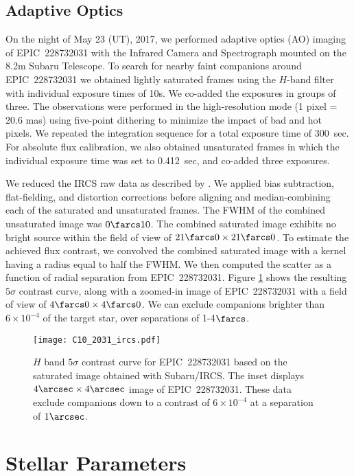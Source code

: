 \documentclass[twocolumn]{aastex61}
\begin{document}
\subsection{Adaptive Optics}

On the night of May 23 (UT), 2017, we performed adaptive optics (AO) imaging of EPIC~228732031
with the Infrared Camera and Spectrograph \citep[IRCS:][]{Kobayashi2000} mounted 
on the 8.2m Subaru Telescope. To search for nearby faint companions around EPIC~228732031
we obtained lightly saturated frames using the $H$-band filter with individual exposure times 
of 10s. We co-added the exposures in groups of three.
The observations were performed in the high-resolution mode (1 pixel = 20.6 mas)
using five-point dithering to minimize the impact of bad and hot pixels. We repeated 
the integration sequence for a total exposure time of 300~sec.
For absolute 
flux calibration, we also obtained unsaturated frames in which the individual exposure time was 
set to 0.412~sec, and co-added three exposures.

We reduced the IRCS raw data as described by \citet{Hirano2016}. We applied
bias subtraction, flat-fielding, and distortion corrections before aligning and 
median-combining each of the saturated and unsaturated frames.
The FWHM of the combined unsaturated image was $0\farcs 10$.
The combined saturated image exhibits no bright source within the field of view of $21\farcs0\times 21\farcs0$. 
To estimate the achieved flux contrast, we convolved the combined saturated 
image with a kernel having a radius equal to half the FWHM. We then computed the scatter 
as a function of radial separation from EPIC~228732031. Figure \ref{ircs} 
shows the resulting $5\sigma$ contrast curve, along with a zoomed-in image of
EPIC~228732031 with a field of view of $4\farcs0\times 4\farcs0$. We can exclude companions brighter than $6\times10^{-4}$ of the target star, over separations of 1-4$\farcs$. 

\begin{figure}
\centering\texttt{[image: C10\_2031\_ircs.pdf]}
\caption{$H$ band $5\sigma$ contrast curve for EPIC~228732031 based on the saturated image
obtained with Subaru/IRCS. The inset displays $4\arcsec\times 4\arcsec$ image
of EPIC~228732031. These data exclude companions down to a contrast of $6\times10^{-4}$
at a separation of $1\arcsec$.}
\label{ircs}
\end{figure}

\section{Stellar Parameters}
\end{document}
